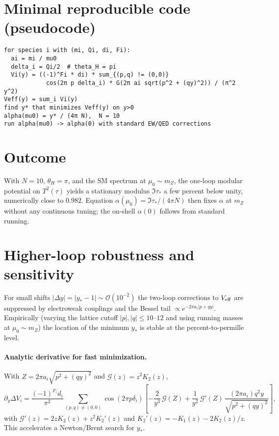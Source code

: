 \documentclass[11pt,a4paper]{article}
\begin{document}
\section*{Minimal reproducible code (pseudocode)}
\begin{verbatim}
for species i with (mi, Qi, di, Fi):
  ai = mi / mu0
  delta_i = Qi/2  # theta_H = pi
  Vi(y) = ((-1)^Fi * di) * sum_{(p,q) != (0,0)}
            cos(2π p delta_i) * G(2π ai sqrt(p^2 + (qy)^2)) / (π^2 y^2)
Veff(y) = sum_i Vi(y)
find y* that minimizes Veff(y) on y>0
alpha(mu0) = y* / (4π N),  N = 10
run alpha(mu0) -> alpha(0) with standard EW/QED corrections
\end{verbatim}

\section*{Outcome}
With \(N=10\), \(\theta_H=\pi\), and the SM spectrum at \(\mu_0\sim m_Z\), the one-loop modular potential on \(T^2(\tau)\) yields a stationary modulus \(\Im\tau_*\) a few percent below unity, numerically close to \(0.982\). Equation \(\alpha(\mu_0)=\Im\tau_*/(4\pi N)\) then fixes \(\alpha\) at \(m_Z\) without any continuous tuning; the on-shell \(\alpha(0)\) follows from standard running.


\section{Higher-loop robustness and sensitivity}
For small shifts $|\Delta y|=|y_*-1|\sim\mathcal{O}(10^{-2})$ the two-loop corrections to
$V_{\rm eff}$ are suppressed by electroweak couplings and the Bessel tail
$\propto e^{-2\pi a_i|p+qy|}$. Empirically (varying the lattice cutoff
$|p|,|q|\le 10$--$12$ and using running masses at $\mu_0\sim m_Z$) the location of
the minimum $y_*$ is stable at the percent-to-permille level.

\paragraph{Analytic derivative for fast minimization.}
With $Z=2\pi a_i\sqrt{p^2+(qy)^2}$ and $\mathcal{G}(z)=z^2K_2(z)$,
\[
\partial_y \Delta V_i=\frac{(-1)^{F_i} d_i}{\pi^2}\!\sum_{(p,q)\ne(0,0)}\!
\cos(2\pi p \delta_i)\left[
-\frac{2}{y^3}\,\mathcal{G}(Z)
+\frac{1}{y^2}\,\mathcal{G}'(Z)\,\frac{(2\pi a_i) q^2 y}{\sqrt{p^2+(qy)^2}}
\right],
\]
with $\mathcal{G}'(z)=2z K_2(z)+z^2 K_2'(z)$ and $K_2'(z)=-K_1(z)-2K_2(z)/z$.
This accelerates a Newton/Brent search for $y_*$.
\end{document}
